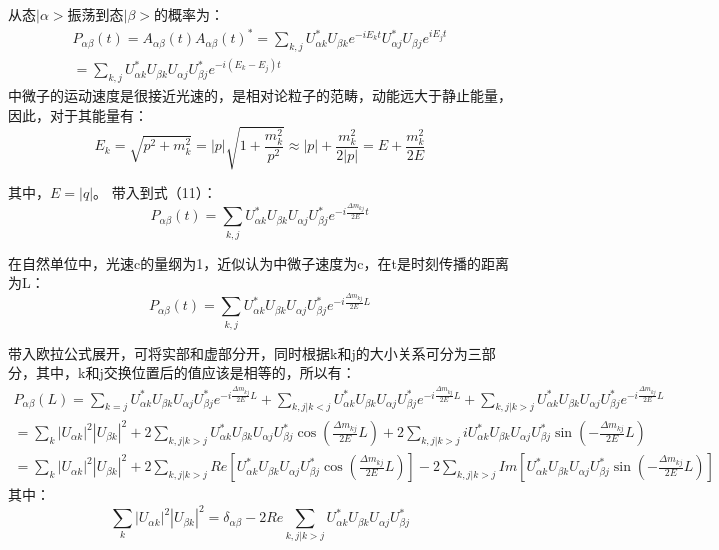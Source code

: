 \documentclass[10pt,a4paper]{article}
\begin{document}
从态$|\alpha>$振荡到态$|\beta>$的概率为：
\begin{equation}
\begin{split}
P_{\alpha\beta}(t)=A_{\alpha\beta}(t){A_{\alpha\beta}(t)}^*=\sum_{k,j}U_{\alpha k}^{*}U_{\beta k}e^{-iE_{k}t}U_{\alpha j}^{*}U_{\beta j}e^{iE_{j}t}\\
=\sum_{k,j}U_{\alpha k}^{*}U_{\beta k}U_{\alpha j}U_{\beta j}^{*}e^{-i(E_{k}-E_{j})t}
\end{split}
\end{equation}
中微子的运动速度是很接近光速的，是相对论粒子的范畴，动能远大于静止能量，因此，对于其能量有：
\begin{equation}
E_{k}=\sqrt{p^2+m_k^2}=|p|\sqrt{1+\frac{m_k^2}{p^2}}\approx |p|+\frac{m_k^2}{2|p|}=E+\frac{m_k^2}{2E}
\end{equation}

其中，$E=|q|$。
带入到式（11）：
\begin{equation}
P_{\alpha\beta}(t)=\sum_{k,j}U_{\alpha k}^{*}U_{\beta k}U_{\alpha j}U_{\beta j}^{*}e^{-i\frac{\Delta m_{kj}}{2E}t}
\end{equation}

在自然单位中，光速c的量纲为1，近似认为中微子速度为c，在t是时刻传播的距离为L：
\begin{equation}
P_{\alpha\beta}(t)=\sum_{k,j}U_{\alpha k}^{*}U_{\beta k}U_{\alpha j}U_{\beta j}^{*}e^{-i\frac{\Delta m_{kj}}{2E}L}
\end{equation}

带入欧拉公式展开，可将实部和虚部分开，同时根据k和j的大小关系可分为三部分，其中，k和j交换位置后的值应该是相等的，所以有：
\begin{equation}
\begin{split}
P_{\alpha\beta}(L)=\sum_{k=j}U_{\alpha k}^{*}U_{\beta k}U_{\alpha j}U_{\beta j}^{*}e^{-i\frac{\Delta m_{kj}}{2E}L}+\sum_{k,j |k<j}U_{\alpha k}^{*}U_{\beta k}U_{\alpha j}U_{\beta j}^{*}e^{-i\frac{\Delta m_{kj}}{2E}L}+\sum_{k,j |k>j}U_{\alpha k}^{*}U_{\beta k}U_{\alpha j}U_{\beta j}^{*}e^{-i\frac{\Delta m_{kj}}{2E}L}\\
=\sum_{k}{|U_{\alpha k}|}^{2}{|U_{\beta k}|}^{2}+2\sum_{k,j |k>j}U_{\alpha k}^{*}U_{\beta k}U_{\alpha j}U_{\beta j}^{*}\cos(\frac{\Delta m_{kj}}{2E}L)+2\sum_{k,j |k>j}iU_{\alpha k}^{*}U_{\beta k}U_{\alpha j}U_{\beta j}^{*}\sin(-\frac{\Delta m_{kj}}{2E}L)\\
=\sum_{k}{|U_{\alpha k}|}^{2}{|U_{\beta k}|}^{2}+2\sum_{k,j |k>j}Re[U_{\alpha k}^{*}U_{\beta k}U_{\alpha j}U_{\beta j}^{*}\cos(\frac{\Delta m_{kj}}{2E}L)]-2\sum_{k,j |k>j}Im[U_{\alpha k}^{*}U_{\beta k}U_{\alpha j}U_{\beta j}^{*}\sin(-\frac{\Delta m_{kj}}{2E}L)]
\end{split}
\end{equation}
其中：\begin{equation}
\sum_{k}{|U_{\alpha k}|}^{2}{|U_{\beta k}|}^{2}=\delta_{\alpha\beta}-2Re\sum_{k,j |k>j}U_{\alpha k}^{*}U_{\beta k}U_{\alpha j}U_{\beta j}^{*}
\end{equation}
\end{document}
